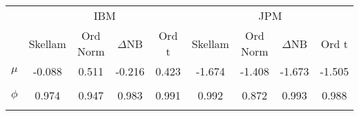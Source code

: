\begin{footnotesize}
\tabcolsep=0.07cm
\begin{singlespace}
\begin{tabular}{ccccccccc} \toprule 
& \multicolumn{4}{c}{IBM}& \multicolumn{4}{c}{JPM} \\ 
\cmidrule(r){2-5} \cmidrule(r){6-9} &  \multicolumn{1}{c}{Skellam}&  \multicolumn{1}{c}{Ord Norm}&  \multicolumn{1}{c}{$\Delta$NB}&  \multicolumn{1}{c}{Ord t}&  \multicolumn{1}{c}{Skellam}&  \multicolumn{1}{c}{Ord Norm}&  \multicolumn{1}{c}{$\Delta$NB}&  \multicolumn{1}{c}{Ord t} \\ \midrule 
$ \mu $ & -0.088 & 0.511 & -0.216 & 0.423 & -1.674 & -1.408 & -1.673 & -1.505 \\ 
 & \begin{tiny} [-0.16,-0.014] \end{tiny}  & \begin{tiny} [0.444,0.579] \end{tiny}  & \begin{tiny} [-0.296,-0.135] \end{tiny}  & \begin{tiny} [0.312,0.535] \end{tiny}  & \begin{tiny} [-1.716,-1.632] \end{tiny}  & \begin{tiny} [-1.43,-1.386] \end{tiny}  & \begin{tiny} [-1.716,-1.631] \end{tiny}  & \begin{tiny} [-1.546,-1.464] \end{tiny}  \\ 
$ \phi $ & 0.974 & 0.947 & 0.983 & 0.991 & 0.992 & 0.872 & 0.993 & 0.988 \\ 
 & \begin{tiny} [0.966,0.981] \end{tiny}  & \begin{tiny} [0.934,0.96] \end{tiny}  & \begin{tiny} [0.978,0.989] \end{tiny}  & \begin{tiny} [0.988,0.994] \end{tiny}  & \begin{tiny} [0.99,0.994] \end{tiny}  & \begin{tiny} [0.858,0.887] \end{tiny}  & \begin{tiny} [0.991,0.994] \end{tiny}  & \begin{tiny} [0.985,0.991] \end{tiny}  \\ 

\end{tabular}
\end{singlespace}
\end{footnotesize}
